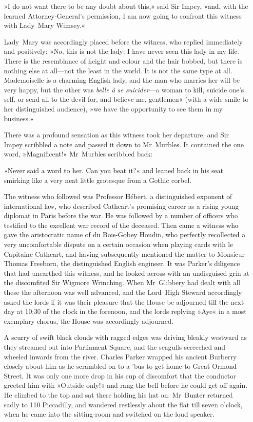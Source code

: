 »I do not want there to be any doubt about this,« said Sir Impey, »and, with the learned Attorney-General's permission, I am now going to confront this witness with Lady~Mary Wimsey.«

Lady~Mary was accordingly placed before the witness, who replied immediately and positively: »No, this is not the lady; I have never seen this lady in my life. There is the resemblance of height and colour and the hair bobbed, but there is nothing else at all—not the least in the world. It is not the same type at all. Mademoiselle is a charming English lady, and the man who marries her will be very happy, but the other was \textit{belle à se suicider}—a woman to kill, suicide one's self, or send all to the devil for, and believe me, gentlemen« (with a wide smile to her distinguished audience), »we have the opportunity to see them in my business.«

There was a profound sensation as this witness took her departure, and Sir Impey scribbled a note and passed it down to Mr~Murbles. It contained the one word, »Magnificent!« Mr~Murbles scribbled back:

»Never said a word to her. Can you beat it?« and leaned back in his seat smirking like a very neat little grotesque from a Gothic corbel.

The witness who followed was Professor Hébert, a distinguished exponent of international law, who described Cathcart's promising career as a rising young diplomat in Paris before the war. He was followed by a number of officers who testified to the excellent war record of the deceased. Then came a witness who gave the aristocratic name of du Bois-Gobey Houdin, who perfectly recollected a very uncomfortable dispute on a certain occasion when playing cards with le Capitaine Cathcart, and having subsequently mentioned the matter to Monsieur Thomas Freeborn, the distinguished English engineer. It was Parker's diligence that had unearthed this witness, and he looked across with an undisguised grin at the discomfited Sir Wigmore Wrinching. When Mr~Glibbery had dealt with all these the afternoon was well advanced, and the Lord~High Steward accordingly asked the lords if it was their pleasure that the House be adjourned till the next day at 10:30 of the clock in the forenoon, and the lords replying »Aye« in a most exemplary chorus, the House was accordingly adjourned.

A scurry of swift black clouds with ragged edges was driving bleakly westward as they streamed out into Parliament Square, and the seagulls screeched and wheeled inwards from the river. Charles Parker wrapped his ancient Burberry closely about him as he scrambled on to a 'bus to get home to Great Ormond Street. It was only one more drop in his cup of discomfort that the conductor greeted him with »Outside only!« and rang the bell before he could get off again. He climbed to the top and sat there holding his hat on. Mr~Bunter returned sadly to 110 Piccadilly, and wandered restlessly about the flat till seven o'clock, when he came into the sitting-room and switched on the loud speaker.

